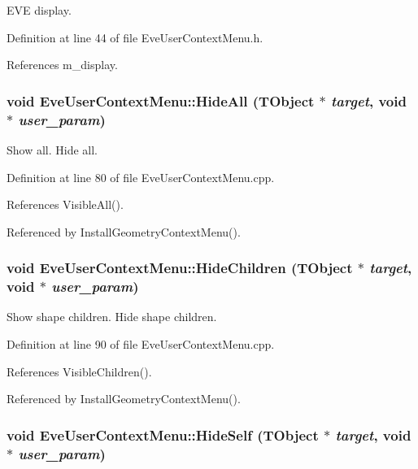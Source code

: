 EVE display. 

Definition at line 44 of file EveUserContextMenu.h.

References m\_\-display.\hypertarget{class_d_d4hep_1_1_eve_user_context_menu_a9aad9343ba738d4e4fdbfe80ecdcec4e}{
\subsubsection[{HideAll}]{\setlength{\rightskip}{0pt plus 5cm}void EveUserContextMenu::HideAll ({\bf TObject} $\ast$ {\em target}, \/  void $\ast$ {\em user\_\-param})}}
\label{class_d_d4hep_1_1_eve_user_context_menu_a9aad9343ba738d4e4fdbfe80ecdcec4e}


Show all. Hide all. 

Definition at line 80 of file EveUserContextMenu.cpp.

References VisibleAll().

Referenced by InstallGeometryContextMenu().\hypertarget{class_d_d4hep_1_1_eve_user_context_menu_a3dd44ef5d2c2a19002a584bb3aa0b10e}{
\subsubsection[{HideChildren}]{\setlength{\rightskip}{0pt plus 5cm}void EveUserContextMenu::HideChildren ({\bf TObject} $\ast$ {\em target}, \/  void $\ast$ {\em user\_\-param})}}
\label{class_d_d4hep_1_1_eve_user_context_menu_a3dd44ef5d2c2a19002a584bb3aa0b10e}


Show shape children. Hide shape children. 

Definition at line 90 of file EveUserContextMenu.cpp.

References VisibleChildren().

Referenced by InstallGeometryContextMenu().\hypertarget{class_d_d4hep_1_1_eve_user_context_menu_afdf1b8efe4a72dd81ec77f0b49b36b0c}{
\subsubsection[{HideSelf}]{\setlength{\rightskip}{0pt plus 5cm}void EveUserContextMenu::HideSelf ({\bf TObject} $\ast$ {\em target}, \/  void $\ast$ {\em user\_\-param})}}
\label{class_d_d4hep_1_1_eve_user_context_menu_afdf1b8efe4a72dd81ec77f0b49b36b0c}


